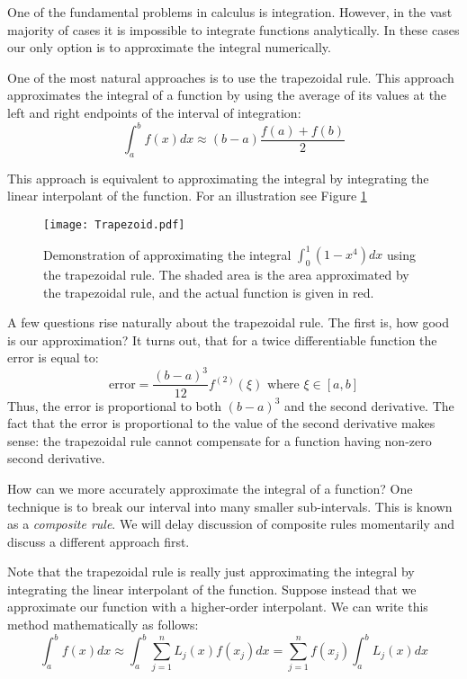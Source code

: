 

One of the fundamental problems in calculus is integration. However, in the vast majority of cases it is impossible to integrate functions analytically. In these cases our only option is to approximate the integral numerically.

One of the most natural approaches is to use the trapezoidal rule. This approach approximates the integral of a function by using the average of its values at the left and right endpoints of the interval of integration:
\[
\int_a^b f(x) dx \approx (b-a)\frac{f(a) + f(b)}{2}
\]

This approach is equivalent to approximating the integral by integrating the linear interpolant of the function. For an illustration see Figure \ref{Fig:Trapezoidal}

\begin{figure}
\begin{center}
\texttt{[image: Trapezoid.pdf]}
\caption{Demonstration of approximating the integral $\int_0^1 (1-x^4)dx$ using the trapezoidal rule. The shaded area is the area approximated by the trapezoidal rule, and the actual function is given in red.}
\label{Fig:Trapezoidal}
\end{center}
\end{figure}

A few questions rise naturally about the trapezoidal rule. The first is, how good is our approximation? It turns out, that for a twice differentiable function the error is equal to:
\[
\mbox{error} = \frac{(b-a)^3}{12}f^{(2)}(\xi) \mbox{ where } \xi \in [a,b]
\]
Thus, the error is proportional to both $(b-a)^3$ and the second derivative. The fact that the error is proportional to the value of the second derivative makes sense: the trapezoidal rule cannot compensate for a function having non-zero second derivative.

How can we more accurately approximate the integral of a function? One technique is to break our interval into many smaller sub-intervals. This is known as a \emph{composite rule}. We will delay discussion of composite rules momentarily and discuss a different approach first.

Note that the trapezoidal rule is really just approximating the integral by integrating the linear interpolant of the function. Suppose instead that we approximate our function with a higher-order interpolant. We can write this method mathematically as follows:
\[
\int_a^b f(x) dx \approx \int_a^b \sum_{j=1}^n L_j(x)f(x_j) dx = \sum_{j=1}^n f(x_j)\int_a^b L_j(x) dx
\]

